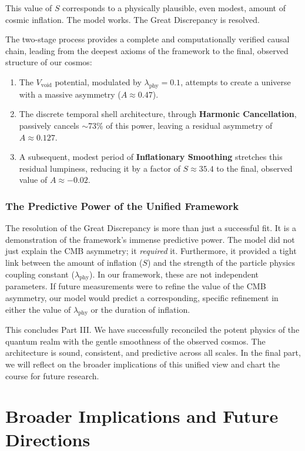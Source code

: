 \documentclass[12pt]{report}
\begin{document}
This value of $S$ corresponds to a physically plausible, even modest, amount of cosmic inflation. The model works. The Great Discrepancy is resolved.

The two-stage process provides a complete and computationally verified causal chain, leading from the deepest axioms of the framework to the final, observed structure of our cosmos:
\begin{enumerate}
    \item The $V_{\text{void}}$ potential, modulated by $\lambda_{\text{phy}}=0.1$, attempts to create a universe with a massive asymmetry ($A \approx 0.47$).
    \item The discrete temporal shell architecture, through \textbf{Harmonic Cancellation}, passively cancels $\sim$73\% of this power, leaving a residual asymmetry of $A \approx 0.127$.
    \item A subsequent, modest period of \textbf{Inflationary Smoothing} stretches this residual lumpiness, reducing it by a factor of $S \approx 35.4$ to the final, observed value of $A \approx -0.02$.
\end{enumerate}

\section{The Predictive Power of the Unified Framework}
The resolution of the Great Discrepancy is more than just a successful fit. It is a demonstration of the framework's immense predictive power. The model did not just explain the CMB asymmetry; it \textit{required} it. Furthermore, it provided a tight link between the amount of inflation ($S$) and the strength of the particle physics coupling constant ($\lambda_{\text{phy}}$). In our framework, these are not independent parameters. If future measurements were to refine the value of the CMB asymmetry, our model would predict a corresponding, specific refinement in either the value of $\lambda_{\text{phy}}$ or the duration of inflation.

This concludes Part III. We have successfully reconciled the potent physics of the quantum realm with the gentle smoothness of the observed cosmos. The architecture is sound, consistent, and predictive across all scales. In the final part, we will reflect on the broader implications of this unified view and chart the course for future research.

\part{Broader Implications and Future Directions}
\end{document}
